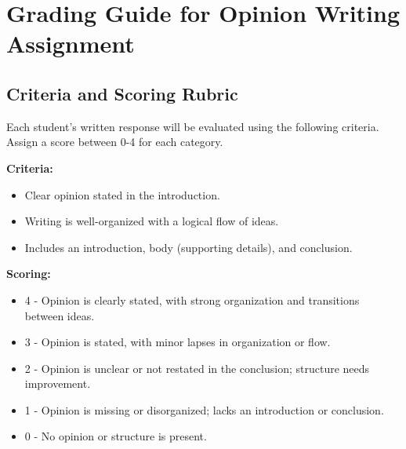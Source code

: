 \documentclass[12pt]{article}
\begin{document}
\section*{Grading Guide for Opinion Writing Assignment}

\subsection*{Criteria and Scoring Rubric}

Each student’s written response will be evaluated using the following criteria. Assign a score between 0-4 for each category.

\begin{tcolorbox}[colframe=black!60, colback=white, title=Purpose, Focus, and Organization]
\textbf{Criteria:}
\begin{itemize}
    \item Clear opinion stated in the introduction.
    \item Writing is well-organized with a logical flow of ideas.
    \item Includes an introduction, body (supporting details), and conclusion.
\end{itemize}
\textbf{Scoring:}
\begin{itemize}
    \item 4 - Opinion is clearly stated, with strong organization and transitions between ideas.
    \item 3 - Opinion is stated, with minor lapses in organization or flow.
    \item 2 - Opinion is unclear or not restated in the conclusion; structure needs improvement.
    \item 1 - Opinion is missing or disorganized; lacks an introduction or conclusion.
    \item 0 - No opinion or structure is present.
\end{itemize}
\end{tcolorbox}
\end{document}
